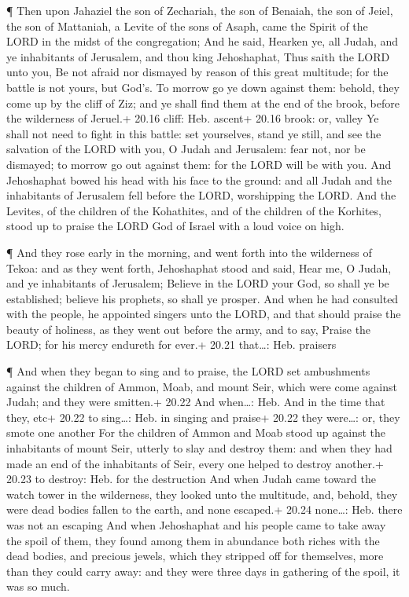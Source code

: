  ¶ Then upon Jahaziel the son of Zechariah, the son of
Benaiah, the son of Jeiel, the son of Mattaniah, a Levite of the sons of
Asaph, came the Spirit of the LORD in the midst of the congregation;
 And he said, Hearken ye, all Judah, and ye inhabitants of
Jerusalem, and thou king Jehoshaphat, Thus saith the LORD unto you, Be
not afraid nor dismayed by reason of this great multitude; for the
battle is not yours, but God's.  To morrow go ye down
against them: behold, they come up by the cliff of Ziz; and ye shall
find them at the end of the brook, before the wilderness of Jeruel.+
20.16 cliff: Heb. ascent+ 20.16 brook: or, valley  Ye shall
not need to fight in this battle: set yourselves, stand ye still, and
see the salvation of the LORD with you, O Judah and Jerusalem: fear not,
nor be dismayed; to morrow go out against them: for the LORD will be
with you.  And Jehoshaphat bowed his head with his face to
the ground: and all Judah and the inhabitants of Jerusalem fell before
the LORD, worshipping the LORD.  And the Levites, of the
children of the Kohathites, and of the children of the Korhites, stood
up to praise the LORD God of Israel with a loud voice on high.

 ¶ And they rose early in the morning, and went forth into
the wilderness of Tekoa: and as they went forth, Jehoshaphat stood and
said, Hear me, O Judah, and ye inhabitants of Jerusalem; Believe in the
LORD your God, so shall ye be established; believe his prophets, so
shall ye prosper.  And when he had consulted with the
people, he appointed singers unto the LORD, and that should praise the
beauty of holiness, as they went out before the army, and to say, Praise
the LORD; for his mercy endureth for ever.+ 20.21 that\ldots: Heb.
praisers

 ¶ And when they began to sing and to praise, the LORD set
ambushments against the children of Ammon, Moab, and mount Seir, which
were come against Judah; and they were smitten.+ 20.22 And when\ldots:
Heb. And in the time that they, etc+ 20.22 to sing\ldots: Heb. in
singing and praise+ 20.22 they were\ldots: or, they smote one another
 For the children of Ammon and Moab stood up against the
inhabitants of mount Seir, utterly to slay and destroy them: and when
they had made an end of the inhabitants of Seir, every one helped to
destroy another.+ 20.23 to destroy: Heb. for the destruction
 And when Judah came toward the watch tower in the
wilderness, they looked unto the multitude, and, behold, they were dead
bodies fallen to the earth, and none escaped.+ 20.24 none\ldots: Heb.
there was not an escaping  And when Jehoshaphat and his
people came to take away the spoil of them, they found among them in
abundance both riches with the dead bodies, and precious jewels, which
they stripped off for themselves, more than they could carry away: and
they were three days in gathering of the spoil, it was so much.

